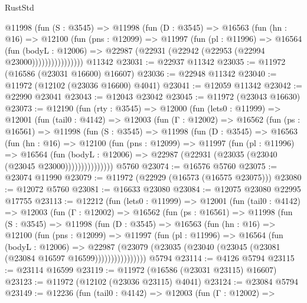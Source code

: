 \begin{lexlean}{RustStd}
\begin{coremodule}
              @11998
                (fun (S : @3545) =>
                @11998
                  (fun (D : @3545) =>
                  @16563
                    (fun (hn : @16) =>
                    @12100
                      (fun (pns : @12099) =>
                      @11997
                        (fun (pl : @11996) =>
                        @16564
                          (fun (bodyL : @12006) =>
                          @22987 (@22931 (@22942 (@22953 (@22994 @23000))))))))))))))))
    @11342
@23031 := @22937 @11342
@23035 := @11972 (@16586 (@23031 @16600) @16607)
@23036 := @22948 @11342
@23040 := @11972 (@12102 (@23036 @16600) @4041)
@23041 := @12059 @11342
@23042 := @22990 @23041
@23043 := @12043 @23042
@23045 := @11972 (@23043 @16630)
@23073 := @12190
    (fun (rty : @3545) =>
    @12000
      (fun (lets0 : @11999) =>
      @12001
        (fun (tail0 : @4142) =>
        @12003
          (fun (Γ : @12002) =>
          @16562
            (fun (ps : @16561) =>
            @11998
              (fun (S : @3545) =>
              @11998
                (fun (D : @3545) =>
                @16563
                  (fun (hn : @16) =>
                  @12100
                    (fun (pns : @12099) =>
                    @11997
                      (fun (pl : @11996) =>
                      @16564
                        (fun (bodyL : @12006) =>
                        @22987 (@22931 (@23035 (@23040 (@23045 @23000)))))))))))))))
    @5760
@23074 := @16576 @5760
@23075 := @23074 @11990
@23079 := @11972 (@22929 (@16573 (@16575 @23075)))
@23080 := @12072 @5760
@23081 := @16633 @23080
@23084 := @12075 @23080 @22995 @17755
@23113 := @12212
    (fun (lets0 : @11999) =>
    @12001
      (fun (tail0 : @4142) =>
      @12003
        (fun (Γ : @12002) =>
        @16562
          (fun (ps : @16561) =>
          @11998
            (fun (S : @3545) =>
            @11998
              (fun (D : @3545) =>
              @16563
                (fun (hn : @16) =>
                @12100
                  (fun (pns : @12099) =>
                  @11997
                    (fun (pl : @11996) =>
                    @16564
                      (fun (bodyL : @12006) =>
                      @22987
                        (@23079
                          (@23035 (@23040 (@23045 (@23081 (@23084 @16597 @16599))))))))))))))))
    @5794
@23114 := @4126 @5794
@23115 := @23114 @16599
@23119 := @11972 (@16586 (@23031 @23115) @16607)
@23123 := @11972 (@12102 (@23036 @23115) @4041)
@23124 := @23084 @5794
@23149 := @12236
    (fun (tail0 : @4142) =>
    @12003
      (fun (Γ : @12002) =>

\end{coremodule}
\end{lexlean}
